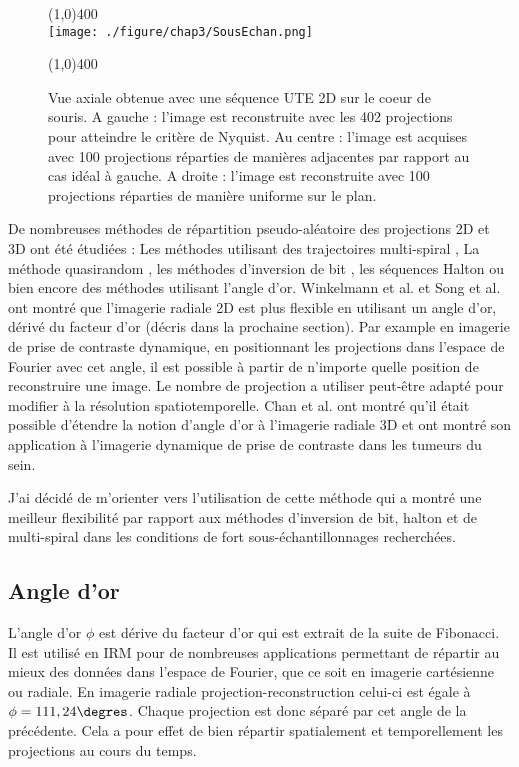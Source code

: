 \begin{figure}[H]
\centering
\line(1,0){400} \\
\texttt{[image: ./figure/chap3/SousEchan.png]}
\caption[Sous-échantillonnage]{\label{fig:SousEchan} Vue axiale obtenue avec une séquence UTE 2D sur le coeur de souris. A gauche : l'image est reconstruite avec les 402 projections pour atteindre le critère de Nyquist. Au centre : l'image est acquises avec 100 projections réparties de manières adjacentes par rapport au cas idéal à gauche. A droite : l'image est reconstruite avec 100 projections réparties de manière uniforme sur le plan.}
\line(1,0){400} \\ \end{figure}

De nombreuses méthodes de répartition pseudo-aléatoire des projections 2D et 3D ont été étudiées : Les méthodes utilisant des trajectoires multi-spiral \cite{Chan:2009uq}, La méthode quasirandom \cite{Tibiletti2015Multistage-thre}, les méthodes d'inversion de bit \cite{Theilmann2004View-ordering-i}, les séquences Halton \cite{chan2009halton} ou bien encore des méthodes utilisant l'angle d'or\cite{Winkelmann:2007fk}. Winkelmann et al. \cite{Winkelmann:2007fk} et Song et al. \cite{Song:2000fk} ont montré que l'imagerie radiale 2D est plus flexible en utilisant un angle d'or, dérivé du facteur d'or (décris dans la prochaine section). Par example en imagerie de prise de contraste dynamique, en positionnant les projections dans l'espace de Fourier avec cet angle, il est possible à partir de n'importe quelle position de reconstruire une image. Le nombre de projection a utiliser peut-être adapté pour modifier à la résolution spatiotemporelle. Chan et al. \cite{Chan:2009uq} ont montré qu'il était possible d'étendre la notion d'angle d'or à l'imagerie radiale 3D et ont montré son application à l'imagerie dynamique de prise de contraste dans les tumeurs du sein.

J'ai décidé de m'orienter vers l'utilisation de cette méthode qui a montré une meilleur flexibilité par rapport aux méthodes d'inversion de bit, halton et de multi-spiral dans les conditions de fort sous-échantillonnages recherchées.

\subsection{Angle d'or}

L'angle d'or $\phi$ est dérive du facteur d'or qui est extrait de la suite de Fibonacci. Il est utilisé en IRM pour de nombreuses applications permettant de répartir au mieux des données dans l'espace de Fourier, que ce soit en imagerie cartésienne \cite{derbyshire2011golden} ou radiale. En imagerie radiale projection-reconstruction celui-ci est égale à $\phi=111,24 \degres$. Chaque projection est donc séparé par cet angle de la précédente. Cela a pour effet de bien répartir spatialement et temporellement les projections au cours du temps.

